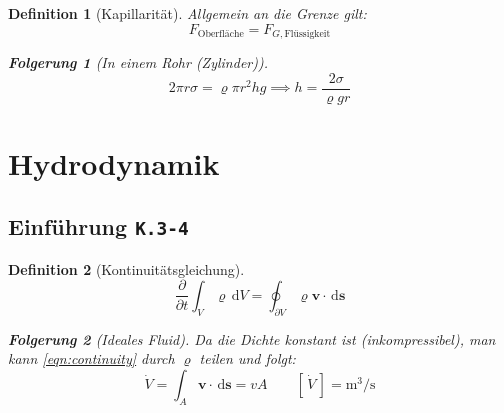 \documentclass[a4paper, twocolumn]{article}
\numberwithin{equation}{section}
\theoremstyle{hsr-def}
\newtheorem{definition}{Definition}[section]
\theoremstyle{hsr-sub}
\newtheorem{result}{Folgerung}[definition]
\newtheorem{remark}{Bemerkung}[definition]
\newcommand{\dd}[1]{\ensuremath{\mathrm{d}#1}}
\newcommand{\di}[1]{\,\dd{#1}}
\newcommand{\pderiv}[2]{\ensuremath{\frac{\partial #1}{\partial #2}}}
\renewcommand{\vec}[1]{\ensuremath{\mathbf{#1}}}
\newcommand{\unitsof}[1]{\ensuremath{\left[\,#1\,\right]}}
\newcommand{\fromlecture}[1]{\textcolor{red!70!black}{\small\texttt{K.#1}}}
\begin{document}
\begin{definition}[Kapillarit\"at]
Allgemein an die Grenze gilt:
\[
    F_\text{Oberfl\"ache} = F_{G,\text{Fl\"ussigkeit}}
\]
\begin{result}[In einem Rohr (Zylinder)]
\[
    2\pi r\sigma = \varrho\pi r^2 hg \implies  h = \frac{2\sigma}{\varrho g r}
\]
\end{result}
\end{definition}

\section{Hydrodynamik}
\subsection{Einf\"uhrung \fromlecture{3-4}}
\begin{definition}[Kontinuit\"atsgleichung]
\begin{equation} \label{eqn:continuity}
    \pderiv{}{t}\int_V \varrho \di{V} 
    = \oint_{\partial V} \varrho \vec{v}\cdot\di{\vec{s}}
\end{equation}

\begin{result}[Ideales Fluid]
Da die Dichte konstant ist (inkompressibel), man kann \eqref{eqn:continuity} durch \(\varrho\) teilen und folgt:
\[
    \dot{V} = \int_A \vec{v}\cdot\di{\vec{s}} = vA
    \qquad
    \unitsof{\dot{V}} = \si{\cubic\metre\per\second}
\]
\end{result}

\end{definition}
\end{document}
